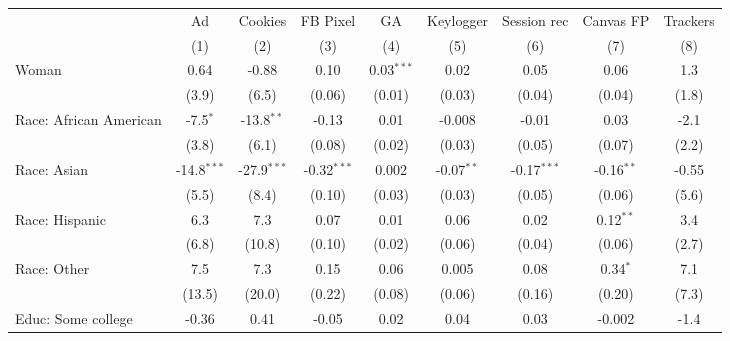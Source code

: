 
\begingroup
\centering
\begin{adjustbox}{width = \textwidth, center}
   \begin{tabular}{lcccccccc}
      \toprule
                              & Ad            & Cookies       & FB Pixel      & GA           & Keylogger    & Session rec   & Canvas FP    & Trackers \\   
                              & (1)           & (2)           & (3)           & (4)          & (5)          & (6)           & (7)          & (8)\\  
      \midrule 
      Woman                   & 0.64          & -0.88         & 0.10          & 0.03$^{***}$ & 0.02         & 0.05          & 0.06         & 1.3\\   
                              & (3.9)         & (6.5)         & (0.06)        & (0.01)       & (0.03)       & (0.04)        & (0.04)       & (1.8)\\   
      Race: African American  & -7.5$^{*}$    & -13.8$^{**}$  & -0.13         & 0.01         & -0.008       & -0.01         & 0.03         & -2.1\\   
                              & (3.8)         & (6.1)         & (0.08)        & (0.02)       & (0.03)       & (0.05)        & (0.07)       & (2.2)\\   
      Race: Asian             & -14.8$^{***}$ & -27.9$^{***}$ & -0.32$^{***}$ & 0.002        & -0.07$^{**}$ & -0.17$^{***}$ & -0.16$^{**}$ & -0.55\\   
                              & (5.5)         & (8.4)         & (0.10)        & (0.03)       & (0.03)       & (0.05)        & (0.06)       & (5.6)\\   
      Race: Hispanic          & 6.3           & 7.3           & 0.07          & 0.01         & 0.06         & 0.02          & 0.12$^{**}$  & 3.4\\   
                              & (6.8)         & (10.8)        & (0.10)        & (0.02)       & (0.06)       & (0.04)        & (0.06)       & (2.7)\\   
      Race: Other             & 7.5           & 7.3           & 0.15          & 0.06         & 0.005        & 0.08          & 0.34$^{*}$   & 7.1\\   
                              & (13.5)        & (20.0)        & (0.22)        & (0.08)       & (0.06)       & (0.16)        & (0.20)       & (7.3)\\   
      Educ: Some college      & -0.36         & 0.41          & -0.05         & 0.02         & 0.04         & 0.03          & -0.002       & -1.4\\   

\end{tabular}
\end{adjustbox}
